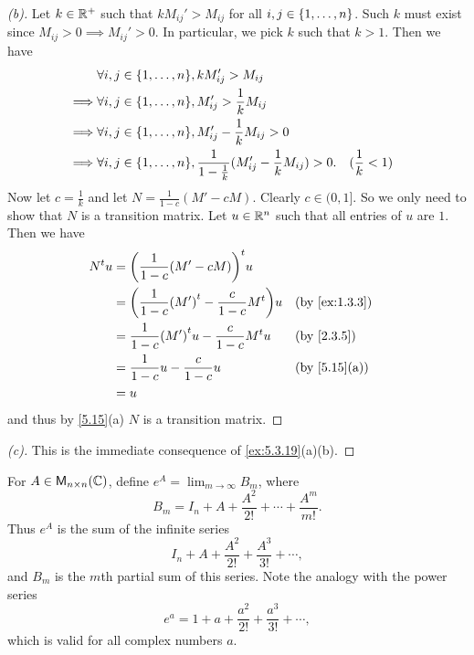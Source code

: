 \begin{proof}[(b)]
  Let \(k \in \mathbb{R}^+\) such that \(k M_{i j}' > M_{i j}\) for all \(i, j \in \left\lbrace1, \dots, n\right\rbrace\).
  Such \(k\) must exist since \(M_{i j} > 0 \implies M_{i j}' > 0\).
  In particular, we pick \(k\) such that \(k > 1\).
  Then we have
  \begin{align*}
             & \forall i, j \in \set{1, \dots, n}, k M_{i j}' > M_{i j}                                                                   \\
    \implies & \forall i, j \in \set{1, \dots, n}, M_{i j}' > \frac{1}{k} M_{i j}                                                         \\
    \implies & \forall i, j \in \set{1, \dots, n}, M_{i j}' - \frac{1}{k} M_{i j} > 0                                                     \\
    \implies & \forall i, j \in \set{1, \dots, n}, \frac{1}{1 - \frac{1}{k}} (M_{i j}' - \frac{1}{k} M_{i j}) > 0. &  & (\frac{1}{k} < 1)
  \end{align*}
  Now let \(c = \frac{1}{k}\) and let \(N = \frac{1}{1 - c} (M' - cM)\).
  Clearly \(c \in (0, 1]\).
  So we only need to show that \(N\) is a transition matrix.
  Let \(u \in \mathbb{R}^n\) such that all entries of \(u\) are \(1\).
  Then we have
  \begin{align*}
    \tp{N} u & = \tp{\pa{\frac{1}{1 - c} (M' - cM)}} u                                                      \\
             & = \pa{\frac{1}{1 - c} \tp{(M')} - \frac{c}{1 - c} \tp{M}} u &  & \text{(by \cref{ex:1.3.3})} \\
             & = \frac{1}{1 - c} \tp{(M')} u - \frac{c}{1 - c} \tp{M} u    &  & \text{(by \cref{2.3.5})}    \\
             & = \frac{1}{1 - c} u - \frac{c}{1 - c} u                     &  & \text{(by \cref{5.15}(a))}  \\
             & = u
  \end{align*}
  and thus by \cref{5.15}(a) \(N\) is a transition matrix.
\end{proof}

\begin{proof}[(c)]
  This is the immediate consequence of \cref{ex:5.3.19}(a)(b).
\end{proof}

\begin{defn}\label{5.3.18}
  For \(A \in \mathsf{M}_{{n} \times n}({\mathbb{C}})\), define \(e^A = \lim_{m \to \infty} B_m\), where
  \[
    B_m = I_n + A + \frac{A^2}{2!} + \cdots + \frac{A^m}{m!}.
  \]
  Thus \(e^A\) is the sum of the infinite series
  \[
    I_n + A + \frac{A^2}{2!} + \frac{A^3}{3!} + \cdots,
  \]
  and \(B_m\) is the \(m\)th partial sum of this series.
  Note the analogy with the power series
  \[
    e^a = 1 + a + \frac{a^2}{2!} + \frac{a^3}{3!} + \cdots,
  \]
  which is valid for all complex numbers \(a\).
\end{defn}

